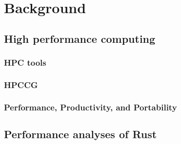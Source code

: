\chapter{Background}
\label{ch:background}



\section{High performance computing}
\label{sec:hpc} %


\subsection{HPC tools}
\label{ssec:hpc-tools} %


\subsection{HPCCG}
\label{ssec:hpccg} %


\subsection{Performance, Productivity, and Portability}
\label{ssec:p3hpc} %


\section{Performance analyses of Rust} %
\label{sec:related-work-rust-performance}
